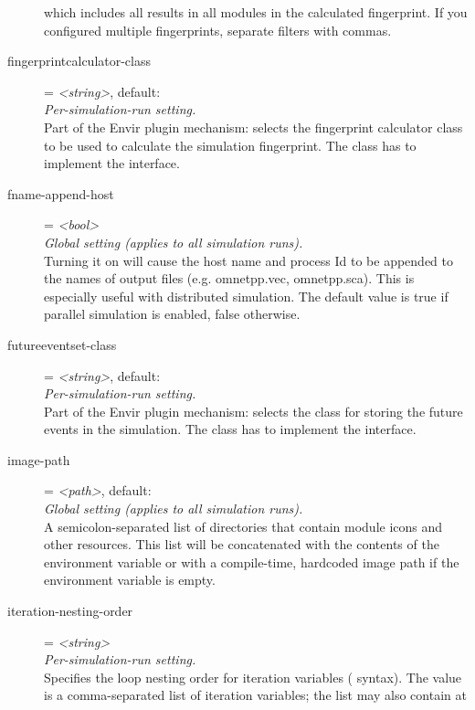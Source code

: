 \begin{description}
    which includes all results in all modules in the calculated fingerprint. If
    you configured multiple fingerprints, separate filters with commas.
\item[fingerprintcalculator-class] = \textit{<string>}, default: \\
    \textit{Per-simulation-run setting.}\\
    Part of the Envir plugin mechanism: selects the fingerprint calculator
    class to be used to calculate the simulation fingerprint. The class has to
    implement the  interface.
\item[fname-append-host] = \textit{<bool>}\\
    \textit{Global setting (applies to all simulation runs).}\\
    Turning it on will cause the host name and process Id to be appended to the
    names of output files (e.g. omnetpp.vec, omnetpp.sca). This is especially
    useful with distributed simulation. The default value is true if parallel
    simulation is enabled, false otherwise.
\item[futureeventset-class] = \textit{<string>}, default: \\
    \textit{Per-simulation-run setting.}\\
    Part of the Envir plugin mechanism: selects the class for storing the
    future events in the simulation. The class has to implement the
     interface.
\item[image-path] = \textit{<path>}, default: \\
    \textit{Global setting (applies to all simulation runs).}\\
    A semicolon-separated list of directories that contain module icons and
    other resources. This list will be concatenated with the contents of the
     environment variable or with a compile-time,
    hardcoded image path if the environment variable is empty.
\item[iteration-nesting-order] = \textit{<string>}\\
    \textit{Per-simulation-run setting.}\\
    Specifies the loop nesting order for iteration variables
    (\ttt{\$\{{\allowbreak}\}{\allowbreak}} syntax). The value is a
    comma-separated list of iteration variables; the list may also contain at

\end{description}
